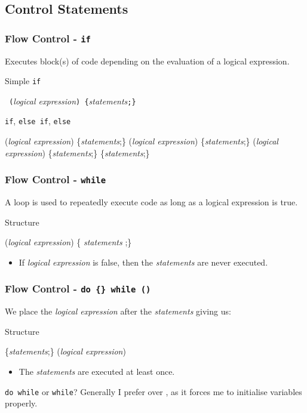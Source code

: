 \documentclass[smaller,handout,table]{beamer}
\begin{document}
\subsection{Control Statements}
\begin{frame}[fragile]
\frametitle{Flow Control - {\tt if}}
Executes block(s) of code depending on the evaluation of a logical expression.
\begin{block}{Simple {\tt if}}
\begin{center}{\tt {} (}\emph{logical expression}{\tt ) \{}\emph{statements}{\tt ;\}}\end{center}
\end{block}

\begin{block}{{\tt if}, {\tt else if}, {\tt else}}
\begin{semiverbatim}
    (\emph{logical expression})
      \{\emph{statements};\}
    (\emph{logical expression})
      \{\emph{statements};\}
    (\emph{logical expression})
      \{\emph{statements};\}
      \{\emph{statements};\}
\end{semiverbatim}
\end{block}
\end{frame}

\begin{frame}[fragile]
\frametitle{Flow Control - {\tt while}}
A  loop is used to repeatedly execute code as long as a logical expression is true.

\begin{block}{Structure}
\begin{semiverbatim}
    (\emph{logical expression})
      \{ \emph{statements} ;\}
\end{semiverbatim}
\end{block}
\begin{itemize}
\item If \emph{logical expression} is false, then the \emph{statements} are never executed.
\end{itemize}
\end{frame}

\begin{frame}[fragile]
\frametitle{Flow Control - {\tt do \{\} while ()}}
We place the \emph{logical expression} after the \emph{statements} giving us:
\begin{block}{Structure}
\begin{semiverbatim}
    \{\emph{statements};\}
    (\emph{logical expression})
\end{semiverbatim}
\end{block}
\begin{itemize}
\item The \emph{statements} are executed at least once.
\end{itemize}
\begin{exampleblock}{{\tt do while} or {\tt while}?}
Generally I prefer {\tt {}} over {\tt {}}, as it forces me to initialise variables properly.
\end{exampleblock}
\end{frame}
\end{document}
